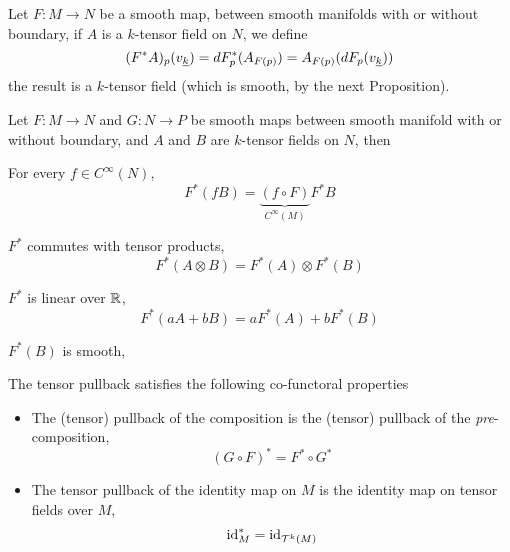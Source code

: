 \documentclass[../main-manifolds.tex]{subfiles}
\begin{document}
\begin{definition}
    Let $F: M\to N$ be a smooth map, between smooth manifolds with or without boundary, if $A$ is a $k$-tensor field on $N$, we define 
    \begin{equation}\label{tensor-field-pullback-eq}
        (F^*A)_p(\Ul{v}[k]) = dF^*_p(A_{F(p)}) = A_{F(p)}(dF_p(\Ul{v}[k]))
    \end{equation}
    the result is a $k$-tensor field (which is smooth, by the next Proposition).
\end{definition}

\begin{wts}
    Let $F: M\to N$ and $G:N\to P$ be smooth maps between smooth manifold with or without boundary, and $A$ and $B$ are $k$-tensor fields on $N$, then
    \begin{enumroman}
        \item For every $f\in C^\infty(N)$,
        \[
            F^*(fB) = \underbrace{(f\circ F)}_{C^\infty(M)}F^*B
        \]
        \item $F^*$ commutes with tensor products,
        \[
            F^*(A\otimes B) = F^*(A)\otimes F^*(B)
        \]
        \item $F^*$ is linear over $\mathbb{R}$, 
        \[
            F^*(aA + bB) = aF^*(A) + bF^*(B)
        \]
        \item $F^*(B)$ is smooth,
        \item The tensor pullback satisfies the following co-functoral properties
        \begin{itemize}
            \item The (tensor) pullback of the composition is the (tensor) pullback of the \emph{pre}-composition,
            \[
                (G\circ F)^* = F^*\circ G^*
            \]
            \item The tensor pullback of the identity map on $M$ is the identity map on tensor fields over $M$,
            \[
                \operatorname{id}_{M}^* =\operatorname{id}_{\mathcal{T}^k(M)}
            \]
        \end{itemize}
    \end{enumroman}
\end{wts}
\end{document}
